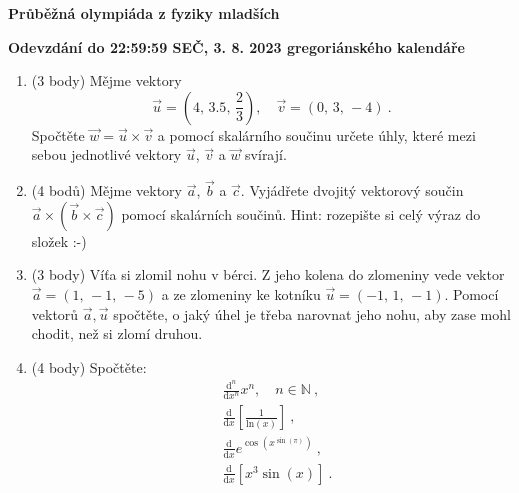 \documentclass[12pt,a4paper]{article}
\begin{document}
\begin{center}
    \textbf{\Large Průběžná olympiáda z fyziky mladších}
    \vspace{1em}
    
    \textbf{Odevzdání do 22:59:59 SEČ, 3. 8. 2023 gregoriánského kalendáře}
\end{center}
\vspace{1em}

\begin{enumerate}[label=\arabic*)]

\item (3 body) Mějme vektory
\begin{equation*}
    \vec{u} = \left(4,\, 3.5,\, \frac{2}{3}\right),\quad \vec{v} = \left(0,\, 3,\, -4\right) ~.
\end{equation*}
Spočtěte $\vec{w} = \vec{u}\times\vec{v}$ a pomocí skalárního součinu určete úhly, které mezi sebou jednotlivé vektory $\vec{u}$, $\vec{v}$ a $\vec{w}$ svírají.

\item (4 bodů)
Mějme vektory $\vec{a}$, $\vec{b}$ a $\vec{c}$. Vyjádřete dvojitý vektorový součin $\vec{a}\times\left(\vec{b}\times\vec{c}\right)$ pomocí skalárních součinů. Hint: rozepište si celý výraz do složek :-)

\item (3 body)
Víťa si zlomil nohu v bérci. Z jeho kolena do zlomeniny vede vektor $\vec{a} = \left(1,\, -1,\, -5\right)$ a ze zlomeniny ke kotníku $\vec{u} = \left(-1,\, 1,\, -1\right)$. Pomocí vektorů $\vec{a},\vec{u}$ spočtěte, o jaký úhel je třeba narovnat jeho nohu, aby zase mohl chodit, než si zlomí druhou.


\item (4 body) Spočtěte:
\begin{align*}
    &\frac{\mathrm{d}^n}{\mathrm{d}x^n}x^n,\quad n\in\mathbb{N} ~,\\
    &\frac{\mathrm{d}}{\mathrm{d}x}\left[\frac{1}{\mathrm{ln}\left(x\right)}\right] ~,\\
    &\frac{\mathrm{d}}{\mathrm{d}x} e^{\cos\left(x^{\sin\left(\pi\right)}\right)}     ~,\\
    &\frac{\mathrm{d}}{\mathrm{d}x}\left[x^3\sin\left(x\right)\right] ~.
\end{align*}


\end{enumerate}
\end{document}
